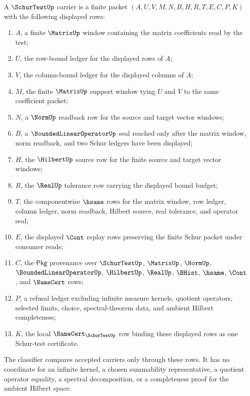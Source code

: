 \begin{definition}
\label{def:schur-test-carrier}
A $\SchurTestUp$ carrier is a finite packet
$(A,U,V,M,N,B,H,R,T,E,C,P,K)$ with the following displayed rows:
\begin{enumerate}
\item $A$, a finite $\MatrixUp$ window containing the matrix coefficients read by the test;
\item $U$, the row-bound ledger for the displayed rows of $A$;
\item $V$, the column-bound ledger for the displayed columns of $A$;
\item $M$, the finite $\MatrixUp$ support window tying $U$ and $V$ to the same coefficient packet;
\item $N$, a $\NormUp$ readback row for the source and target vector windows;
\item $B$, a $\BoundedLinearOperatorUp$ seal reached only after the matrix window, norm readback, and two Schur ledgers have been displayed;
\item $H$, the $\HilbertUp$ source row for the finite source and target vector windows;
\item $R$, the $\RealUp$ tolerance row carrying the displayed bound budget;
\item $T$, the componentwise $\hsame$ rows for the matrix window, row ledger, column ledger, norm readback, Hilbert source, real tolerance, and operator seal;
\item $E$, the displayed $\Cont$ replay rows preserving the finite Schur packet under consumer reads;
\item $C$, the $\mathsf{Pkg}$ provenance over $\SchurTestUp$, $\MatrixUp$, $\NormUp$, $\BoundedLinearOperatorUp$, $\HilbertUp$, $\RealUp$, $\BHist$, $\hsame$, $\Cont$, and $\NameCert$ rows;
\item $P$, a refusal ledger excluding infinite measure kernels, quotient operators, selected limits, choice, spectral-theorem data, and ambient Hilbert completeness;
\item $K$, the local $\NameCert_{\SchurTestUp}$ row binding these displayed rows as one Schur-test certificate.
\end{enumerate}
The classifier compares accepted carriers only through these rows. It has no coordinate for an infinite kernel, a chosen summability representative, a quotient operator equality, a spectral decomposition, or a completeness proof for the ambient Hilbert space.
\end{definition}

